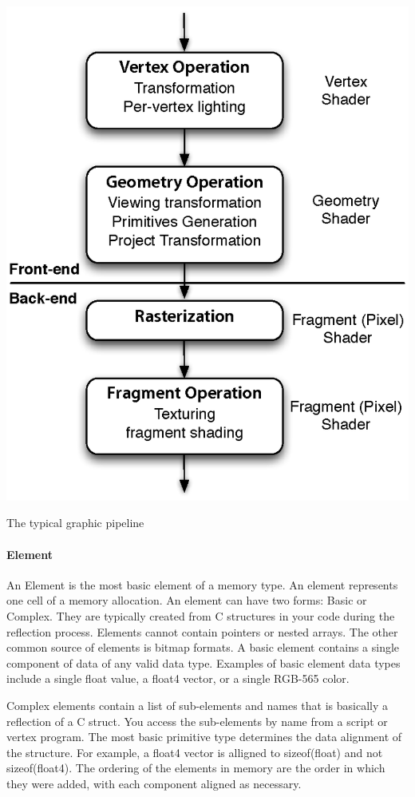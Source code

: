 \begin{center-figure}
    \includegraphics[scale=0.8]{fig/Graphics_Pipeline.eps}
    \caption{The typical graphic pipeline}
    \label{fig:GraphicsPipeline}
\end{center-figure}

\paragraph{Element}
An Element is the most basic element of a memory type. An element represents one cell of a memory allocation. An element can have two forms: Basic or Complex. They are typically created from C structures in your \RS{} code during the reflection process. Elements cannot contain pointers or nested arrays. The other common source of elements is bitmap formats.
A basic element contains a single component of data of any valid \RS{} data type. Examples of basic element data types include a single float value, a float4 vector, or a single RGB-565 color.

Complex elements contain a list of sub-elements and names that is basically a reflection of a C struct. You access the sub-elements by name from a script or vertex program. The most basic primitive type determines the data alignment of the structure. For example, a float4 vector is alligned to sizeof(float) and not sizeof(float4). The ordering of the elements in memory are the order in which they were added, with each component aligned as necessary.

